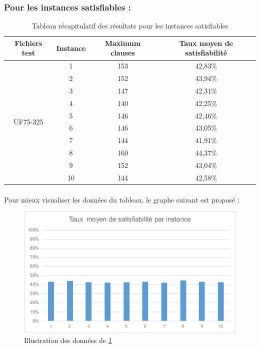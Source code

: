 \subsubsection{Pour les instances satisfiables :}
\begin{table}[H]
	\centering
	\label{table:Tab_BFS_Sat}
	\begin{tabular}{|c|c|c|c|}
		\hline
		Fichiers test              & Instance & Maximum clauses & Taux  moyen de satisfiabilité \\ \hline
		\multirow{10}{*}{UF75-325} & 1        & 153             & 42,83\%                       \\ \cline{2-4} 
		& 2        & 152             & 43,94\%                       \\ \cline{2-4} 
		& 3        & 147             & 42,31\%                       \\ \cline{2-4} 
		& 4        & 140             & 42,25\%                       \\ \cline{2-4} 
		& 5        & 146             & 42,46\%                       \\ \cline{2-4} 
		& 6        & 146             & 43,05\%                       \\ \cline{2-4} 
		& 7        & 144             & 41,91\%                       \\ \cline{2-4} 
		& 8        & 160             & 44,37\%                       \\ \cline{2-4} 
		& 9        & 152             & 43,04\%                       \\ \cline{2-4} 
		& 10       & 144             & 42,58\%                       \\ \hline
	\end{tabular}
	\caption{Tableau récapitulatif des résultats pour les instances satisfiables}
\end{table}
\newpage
\paragraph{}Pour mieux visualiser les données du tableau, le graphe suivant est proposé :\\

\begin{figure}[H]
	\includegraphics[width=\textwidth]{images/BFSUF75Graph.png}
	\caption{Illustration des données de \ref{table:Tab_BFS_Sat}}
\end{figure}

